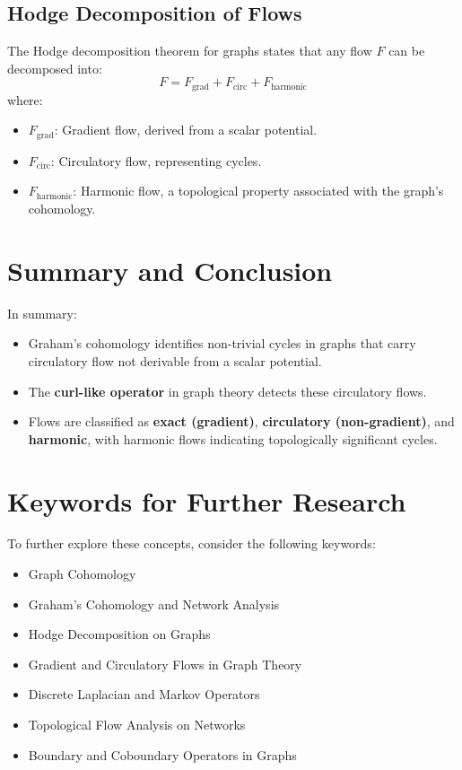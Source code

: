 \documentclass[10pt,a4paper,twocolumn]{article}
\begin{document}
	\subsection{Hodge Decomposition of Flows}
	The Hodge decomposition theorem for graphs states that any flow \( F \) can be decomposed into:
	\[
	F = F_{\text{grad}} + F_{\text{circ}} + F_{\text{harmonic}}
	\]
	where:
	\begin{itemize}
		\item \( F_{\text{grad}} \): Gradient flow, derived from a scalar potential.
		\item \( F_{\text{circ}} \): Circulatory flow, representing cycles.
		\item \( F_{\text{harmonic}} \): Harmonic flow, a topological property associated with the graph’s cohomology.
	\end{itemize}
	
	\section{Summary and Conclusion}
	In summary:
	\begin{itemize}
		\item Graham's cohomology identifies non-trivial cycles in graphs that carry circulatory flow not derivable from a scalar potential.
		\item The \textbf{curl-like operator} in graph theory detects these circulatory flows.
		\item Flows are classified as \textbf{exact (gradient)}, \textbf{circulatory (non-gradient)}, and \textbf{harmonic}, with harmonic flows indicating topologically significant cycles.
	\end{itemize}
	
	\section{Keywords for Further Research}
	To further explore these concepts, consider the following keywords:
	\begin{itemize}
		\item Graph Cohomology
		\item Graham's Cohomology and Network Analysis
		\item Hodge Decomposition on Graphs
		\item Gradient and Circulatory Flows in Graph Theory
		\item Discrete Laplacian and Markov Operators
		\item Topological Flow Analysis on Networks
		\item Boundary and Coboundary Operators in Graphs
	\end{itemize}
	
\end{document}

